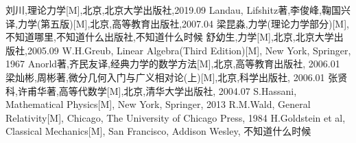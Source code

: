 \documentclass[UTF8]{article}
\begin{document}
	\begin{thebibliography}{?}
		 刘川,理论力学[M],北京,北京大学出版社,2019.09
		 Landau, Lifshitz著,李俊峰,鞠国兴译,力学(第五版)[M],北京,高等教育出版社,2007.04
		 梁昆淼,力学(理论力学部分)[M],不知道哪里,不知道什么出版社,不知道什么时候
		 舒幼生,力学[M],北京,北京大学出版社,2005.09
		 W.H.Greub, Linear Algebra(Third Edition)[M], New York, Springer, 1967
		 Anorld著,齐民友译,经典力学的数学方法[M],北京,高等教育出版社, 2006.01
		 梁灿彬,周彬著,微分几何入门与广义相对论(上)[M],北京,科学出版社, 2006.01
		 张贤科,许甫华著,高等代数学[M],北京,清华大学出版社, 2004.07
		 S.Hassani, Mathematical Physics[M], New York, Springer, 2013
		 R.M.Wald, General Relativity[M], Chicago, The University of Chicago Press, 1984
		 H.Goldstein et al, Classical Mechanics[M], San Francisco, Addison Wesley, 不知道什么时候
	\end{thebibliography}
	
	
	
	
	
	
\end{document}
